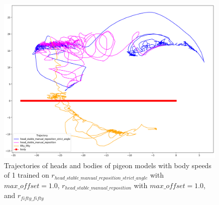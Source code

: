   \begin{figure}[H]
      \centering
      \includegraphics[width=1\textwidth]{figures/head_tracking_results/pigeon_bs_1_all.png}
      \caption{Trajectories of heads and bodies of pigeon models with body speeds of 1 trained on $r_{head\_stable\_manual\_reposition\_strict\_angle}$ with $max\_offset = 1.0$, $r_{head\_stable\_manual\_reposition}$ with $max\_offset = 1.0$, and $r_{fifty\_fifty}$}
      \label{fig:head_bs_1_all}
  \end{figure}




